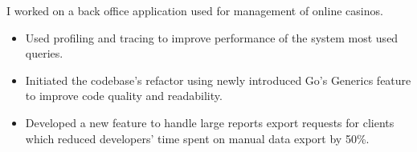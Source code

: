 I worked on a back office application used for management of online casinos. 

\begin{itemize}
    \item Used profiling and tracing to improve performance of the system most used queries.
    \item Initiated the codebase's refactor using newly introduced Go's Generics feature to improve 
            code quality and readability. 
    \item Developed a new feature to handle large reports export requests for clients which reduced developers' 
            time spent on manual data export by 50\%. 
\end{itemize}